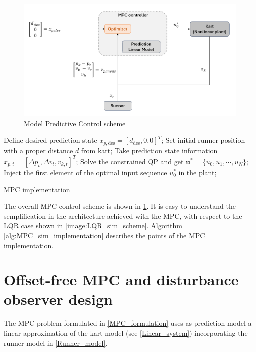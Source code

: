 \documentclass[a4paper,12pt,oneside]{book}
\begin{document}
\begin{figure}
	\centering
	\includegraphics[width=1.0\textwidth]{MPC_sim_scheme.png}
	\caption{Model Predictive Control scheme}
	\label{image:MPC_sim_scheme}
\end{figure}

\begin{algorithm}
\begin{algorithmic}[1]
	\State Define desired prediction state $x_{p,\text{des}} = [d_{\text{des}}, 0, 0]^T$;
	\State Set initial runner position with a proper distance $\bar{d}$ from kart;
		\State Take prediction state information $x_{p,t} = [\Delta p_t, \Delta v_t, v_{k,t}]^T$;
		\State Solve the constrained QP and get $\boldsymbol{u}^* = \{u_0, u_1, \cdots, u_N\}$; 
		\State Inject the first element of the optimal input sequence $u_0^*$ in the plant;
	\EndFor
\caption{MPC implementation}
\label{alg:MPC_sim_implementation}
\end{algorithmic}
\end{algorithm}

The overall MPC control scheme is shown in \ref{image:MPC_sim_scheme}.
It is easy to understand the semplification in the architecture achieved with the MPC, with respect to the LQR case shown in \ref{image:LQR_sim_scheme}.
 Algorithm \ref{alg:MPC_sim_implementation} describes the points of the MPC implementation.

\section{Offset-free MPC and disturbance observer design}
The MPC problem formulated in \ref{MPC_formulation} uses as prediction model a linear approximation of the kart model (see \ref{Linear_system}) incorporating the runner model in \ref{Runner_model}.
\end{document}
